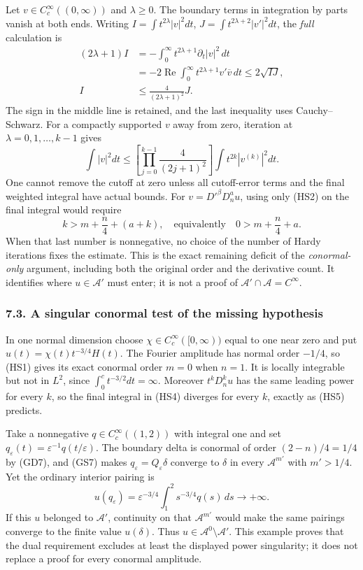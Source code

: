 \documentclass[
  11pt,
]{article}
\begin{document}
Let \(v\in C_c^\infty((0,\infty))\) and \(\lambda\ge0\). The boundary
terms in integration by parts vanish at both ends. Writing
\(I=\int t^{2\lambda}|v|^2dt\), \(J=\int t^{2\lambda+2}|v'|^2dt\), the
\emph{full} calculation is \[
 \begin{aligned}
 (2\lambda+1)I
  &=-\int_0^\infty t^{2\lambda+1}
                     \partial_t|v|^2\,dt\\
  &=-2\operatorname{Re}\int_0^\infty
            t^{2\lambda+1}v'\overline v\,dt
   \le2\sqrt{IJ},\\
 I&\le\frac{4}{(2\lambda+1)^2}J.
 \end{aligned}
 \tag{HS3}
\] The sign in the middle line is retained, and the last inequality uses
Cauchy--Schwarz. For a compactly supported \(v\) away from zero,
iteration at \(\lambda=0,1,\ldots,k-1\) gives \[
 \int|v|^2dt
 \le\left[\prod_{j=0}^{k-1}
          \frac{4}{(2j+1)^2}\right]
       \int t^{2k}|v^{(k)}|^2dt.
 \tag{HS4}
\] One cannot remove the cutoff at zero unless all cutoff-error terms
and the final weighted integral have actual bounds. For
\(v=D'^\beta D_n^a u\), using only (HS2) on the final integral would
require \[
 k>m+\frac n4+(a+k),
 \quad\text{equivalently}\quad 0>m+\frac n4+a.
 \tag{HS5}
\] When that last number is nonnegative, no choice of the number of
Hardy iterations fixes the estimate. This is the exact remaining deficit
of the \emph{conormal-only} argument, including both the original order
and the derivative count. It identifies where \(u\in\mathcal A'\) must
enter; it is not a proof of \(\mathcal A'\cap\mathcal A=C^\infty\).

\subsubsection{7.3. A singular conormal test of the missing
hypothesis}\label{a-singular-conormal-test-of-the-missing-hypothesis}

In one normal dimension choose \(\chi\in C_c^\infty([0,\infty))\) equal
to one near zero and put \(u(t)=\chi(t)t^{-3/4}H(t)\). The Fourier
amplitude has normal order \(-1/4\), so (HS1) gives its exact conormal
order \(m=0\) when \(n=1\). It is locally integrable but not in \(L^2\),
since \(\int_0^c t^{-3/2}dt=\infty\). Moreover \(t^kD_n^ku\) has the
same leading power for every \(k\), so the final integral in (HS4)
diverges for every \(k\), exactly as (HS5) predicts.

Take a nonnegative \(q\in C_c^\infty((1,2))\) with integral one and set
\(q_\varepsilon(t)=\varepsilon^{-1}q(t/\varepsilon)\). The boundary
delta is conormal of order \((2-n)/4=1/4\) by (GD7), and (GS7) makes
\(q_\varepsilon=Q_\varepsilon\delta\) converge to \(\delta\) in every
\(\mathcal A^{m'}\) with \(m'>1/4\). Yet the ordinary interior pairing
is \[
 u(q_\varepsilon)
   =\varepsilon^{-3/4}
       \int_1^2s^{-3/4}q(s)\,ds
   \longrightarrow+\infty.
 \tag{HS6}
\] If this \(u\) belonged to \(\mathcal A'\), continuity on that
\(\mathcal A^{m'}\) would make the same pairings converge to the finite
value \(u(\delta)\). Thus \(u\in\mathcal A^0\setminus\mathcal A'\). This
example proves that the dual requirement excludes at least the displayed
power singularity; it does not replace a proof for every conormal
amplitude.
\end{document}
